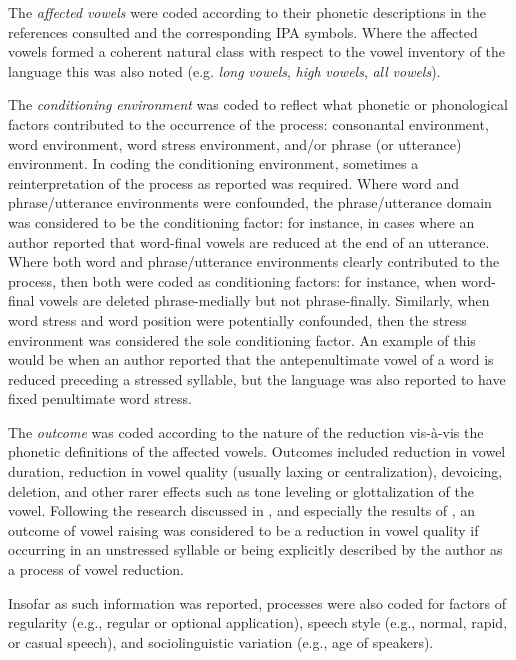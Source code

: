   The \textit{affected} \textit{vowels} were coded according to their phonetic descriptions in the references consulted and the corresponding IPA symbols. Where the affected vowels formed a coherent natural class with respect to the vowel inventory of the language this was also noted (e.g. \textit{long} \textit{vowels}, \textit{high} \textit{vowels}, \textit{all} \textit{vowels}).

  The \textit{conditioning} \textit{environment} was coded to reflect what phonetic or phonological factors contributed to the occurrence of the process: consonantal environment, word environment, word stress environment, and/or phrase (or utterance) environment. In coding the conditioning environment, sometimes a reinterpretation of the process as reported was required. Where word and phrase/utterance environments were confounded, the phrase/utterance domain was considered to be the conditioning factor: for instance, in cases where an author reported that word-final vowels are reduced at the end of an utterance. Where both word and phrase/utterance environments clearly contributed to the process, then both were coded as conditioning factors: for instance, when word-final vowels are deleted phrase-medially but not phrase-finally. Similarly, when word stress and word position were potentially confounded, then the stress environment was considered the sole conditioning factor. An example of this would be when an author reported that the antepenultimate vowel of a word is reduced preceding a stressed syllable, but the language was also reported to have fixed penultimate word stress.

  The \textit{outcome} was coded according to the nature of the reduction vis-à-vis the phonetic definitions of the affected vowels. Outcomes included reduction in vowel duration, reduction in vowel quality (usually laxing or centralization), devoicing, deletion, and other rarer effects such as tone leveling or glottalization of the vowel. Following the research discussed in , and especially the results of \citet{KapatsinskiEtAl2019}, an outcome of vowel raising was considered to be a reduction in vowel quality if occurring in an unstressed syllable or being explicitly described by the author as a process of vowel reduction.

  Insofar as such information was reported, processes were also coded for factors of regularity (e.g., regular or optional application), speech style (e.g., normal, rapid, or casual speech), and sociolinguistic variation (e.g., age of speakers).


